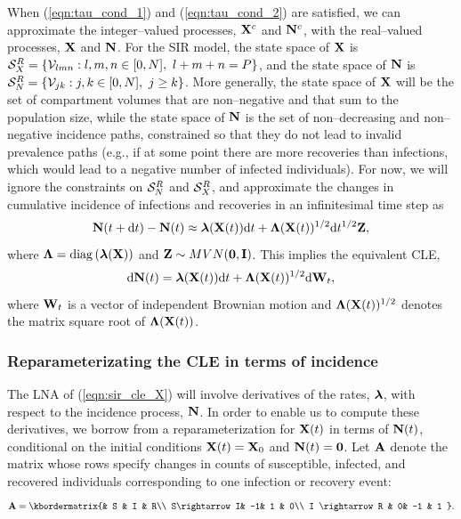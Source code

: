 When (\ref{eqn:tau_cond_1}) and (\ref{eqn:tau_cond_2}) are satisfied, we can approximate the integer--valued processes, $ \mathbf{X}^c $ and $ \mathbf{N}^c $, with the real--valued processes, $ \mathbf{X} $ and $ \mathbf{N} $. For the SIR model, the state space of $ \mathbf{X} $ is $ \mcS_X^R = \lbrace \mcV_{lmn}:l,m,n \in [0,N],\ l+m+n=P\rbrace $, and the state space  of $ \mathbf{N} $ is $ \mathcal{S}_N^R = \lbrace \mathcal{V}_{jk}: j,k \in [0,N],\ j\geq k \rbrace $. More generally, the state space of $ \mathbf{X} $ will be the set of compartment volumes that are non--negative and that sum to the population size, while the state space of $ \mathbf{N} $ is the set of non--decreasing and non--negative incidence paths, constrained so that they do not lead to invalid prevalence paths (e.g., if at some point there are more recoveries than infections, which would lead to a negative number of infected individuals). For now, we will ignore the constraints on $ \mathcal{S}_N^R $ and $ \mathcal{S}_X^R $, and approximate the changes in cumulative incidence of infections and recoveries in an infinitesimal time step as 
\begin{equation}
\mathbf{N}(t+\mathrm{d} t) - \mathbf{N}(t) \approx \boldsymbol{\lambda}(\mathbf{X}(t))\mathrm{d} t + \boldsymbol{\Lambda}(\mathbf{X}(t))^{1/2}\mathrm{d} t^{1/2}\mathbf{Z},
\end{equation}
where $ \boldsymbol{\Lambda} = \mathrm{diag}\left (\boldsymbol{\lambda}(\mathbf{X}) \right )$ and $ \mathbf{Z}\sim MVN(\boldsymbol{0},\mathbf{I}) $. This implies the equivalent CLE,
\begin{equation}
\label{eqn:sir_cle_X}
\mathrm{d} \mathbf{N}(t) = \boldsymbol{\lambda}(\mathbf{X}(t))\mathrm{d} t + \boldsymbol{\Lambda}(\mathbf{X}(t))^{1/2}\mathrm{d}\mathbf{W}_t, 
\end{equation}
where $ \mathbf{W}_t $ is a vector of independent Brownian motion and $ \boldsymbol{\Lambda}(\mathbf{X}(t))^{1/2} $ denotes the matrix square root of $ \boldsymbol{\Lambda}(\mathbf{X}(t)) $. 

\subsubsection{Reparameterizating the CLE in terms of incidence}
\label{subsubsec:cle_repar}
The LNA of (\ref{eqn:sir_cle_X}) will involve derivatives of the rates, $ \boldsymbol{\lambda} $, with respect to the incidence process, $ \mathbf{N} $. In order to enable us to compute these derivatives, we borrow from \cite{breto2011compound,ho2016direct} a reparameterization for $ \mathbf{X} (t)$ in terms of $ \mathbf{N}(t) $, conditional on the initial conditions $ \mathbf{X}(t) = \mathbf{X}_0 $ and $ \mathbf{N}(t) = \boldsymbol{0} $. Let $ \mathbf{A} $ denote the matrix whose rows specify changes in counts of susceptible, infected, and recovered individuals corresponding to one infection or recovery event:
\begin{equation}
\label{eqn:sir_stoich}
\bA = \kbordermatrix{& S & I &  R\\
	S\rightarrow I& -1& 1 & 0\\
	I \rightarrow R & 0& -1 & 1
}.
\end{equation}

